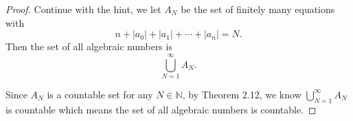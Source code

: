 \begin{Exercise}
	\begin{proof}
		Continue with the hint, we let $A_N$ be the set of finitely many equations with
		$$
		n+|a_0|+|a_1|+\cdots+|a_n| = N.
		$$
		Then the set of all algebraic numbers is 
		$$
		\bigcup_{N=1}^{\infty}A_N.
		$$
		
		Since $A_N$ is a countable set for any $N\in\mathbb{N}$, by Theorem 2.12, we know $\bigcup_{N=1}^{\infty}A_N$ is countable which means the set of all algebraic numbers is countable.
	\end{proof}
\end{Exercise}